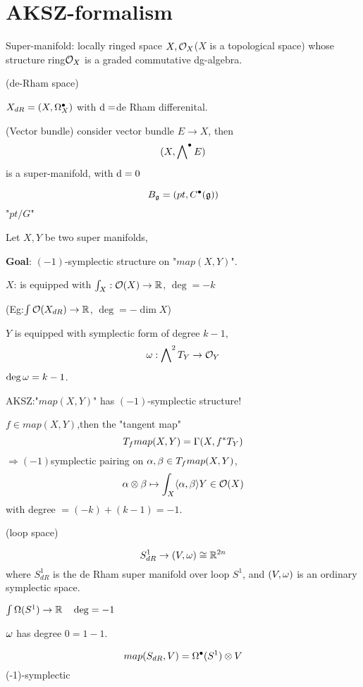 \section{AKSZ-formalism}

Super-manifold: locally ringed space $X,\mathcal{O}_X$($X$ is a topological space)
whose structure ring$\mathcal{O}_X$ is a graded commutative dg-algebra.

\begin{example}(de-Rham space)

$X_{dR}=(X,\Omega_X^{\bullet})$ with $\mathrm{d}=$de Rham differenital.
\end{example}

\begin{example}(Vector bundle)
consider vector bundle $E\to X$, then
$$(X,\bigwedge\nolimits^{\bullet}E)$$
is a super-manifold, with $\mathrm{d}=0$
\end{example}

\begin{example}

$$B_{\mathfrak{g}}=(pt,C^{\bullet}(\mathfrak{g}))$$
"$pt/G$"
\end{example}

Let $X,Y$ be two super manifolds,

\textbf{Goal}: $(-1)$-symplectic structure on "$map(X,Y)$".

$X$: is equipped with $\int_X:\mathcal{O}(X)\to\mathbb{R}$,
$\deg=-k$

(Eg:$\int\mathcal{O}(X_{dR})\to\mathbb{R}$, $\deg=-\dim X$)

$Y$ is equipped with symplectic form of degree $k-1$,
$$\omega:\bigwedge\nolimits^{2}T_Y\to\mathcal{O}_Y$$
$\deg\omega=k-1$.

AKSZ:"$map(X,Y)$" has $(-1)$-symplectic structure!

$f\in map(X,Y)$,then the "tangent map"
$$T_f map(X,Y)=\Gamma(X,f^*T_Y)$$
$\Rightarrow(-1)$symplectic pairing on
$\alpha,\beta\in T_fmap(X,Y)$,
$$\alpha\otimes\beta\mapsto\int_X\langle\alpha,\beta\rangle Y\in\mathcal{O}(X)$$
with degree $=(-k)+(k-1)=-1$.

\begin{example}(loop space)

$$S^1_{dR}\to (V,\omega)\cong \mathbb{R}^{2n}$$
where $S^1_{dR}$ is the de Rham super manifold over loop $S^1$,
and $(V,\omega)$ is an ordinary symplectic space.

$\int\Omega(S^1)\to\mathbb{R}\quad\deg=-1$

$\omega$ has degree $0=1-1$.

$$map(S_{dR},V)=\Omega^{\bullet}(S^1)\otimes V$$
(-1)-symplectic
\end{example}

